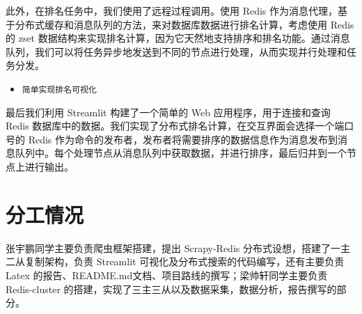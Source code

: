 \documentclass[12pt,hyperref,a4paper,UTF8]{ctexart}
\begin{document}
此外，在排名任务中，我们使用了远程过程调用。使用 Redis 作为消息代理，基于分布式缓存和消息队列的方法，来对数据库数据进行排名计算，考虑使用 Redis 的 zset 数据结构来实现排名计算，因为它天然地支持排序和排名功能。通过消息队列，我们可以将任务异步地发送到不同的节点进行处理，从而实现并行处理和任务分发。

\begin{itemize}
    \item \texttt{简单实现排名可视化}
\end{itemize}

最后我们利用 Streamlit 构建了一个简单的 Web 应用程序，用于连接和查询 Redis 数据库中的数据。我们实现了分布式排名计算，在交互界面会选择一个端口号的 Redis 作为命令的发布者，发布者将需要排序的数据信息作为消息发布到消息队列中。每个处理节点从消息队列中获取数据，并进行排序，最后归并到一个节点上进行输出。

\section{分工情况}

张宇鹏同学主要负责爬虫框架搭建，提出 Scrapy-Redis 分布式设想，搭建了一主二从复制架构，负责 Streamlit 可视化及分布式搜索的代码编写，还有主要负责 Latex 的报告、README.md文档、项目路线的撰写；梁帅轩同学主要负责 Redis-cluster 的搭建，实现了三主三从以及数据采集，数据分析，报告撰写的部分。
\end{document}
